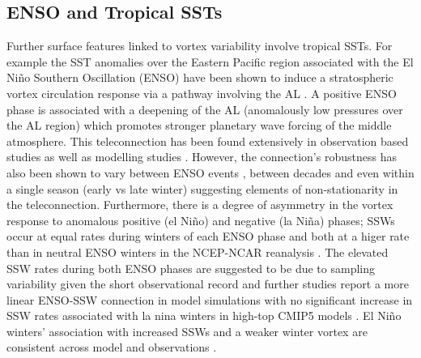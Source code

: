 \subsection{ENSO and Tropical SSTs}
\label{sec:external_influence_SSTs}
Further surface features linked to vortex variability involve tropical SSTs. For example the SST anomalies over the Eastern Pacific region associated with the El Ni\~{n}o Southern Oscillation (ENSO) have been shown to induce a stratospheric vortex circulation response via a pathway involving the AL \citep{domeisenTeleconnection2019}. A positive ENSO phase is associated with a deepening of the AL (anomalously low pressures over the AL region) which promotes stronger planetary wave forcing of the middle atmosphere. This teleconnection has been found extensively in observation based studies \citep{garfinkelDifferent2008, inesonRole2009, smithLinear2012} as well as modelling studies \citep{bellStratospheric2009, domeisenSeasonal2015, manziniInfluence2006, richterEffects2015}. However, the connection's robustness has also been shown to vary between ENSO events \citep{deserNorthern2017, izaStratospheric2016}, between decades \citep{ayarzaguena2018} and even within a single season (early vs late winter) \citep{ayarzaguenaIntraseasonal2018a} suggesting elements of non-stationarity in the teleconnection. Furthermore, there is a degree of asymmetry in the vortex response to anomalous positive (el Ni\~{n}o) and negative (la Ni\~{n}a) phases; SSWs occur at equal rates during winters of each ENSO phase and both at a higer rate than in neutral ENSO winters in the NCEP-NCAR reanalysis \citep{butlerNino2011, Garfinkel2012whymight}. The elevated SSW rates during both ENSO phases are suggested to be due to sampling variability given the short observational record and further studies report a more linear ENSO-SSW connection in model simulations \citep{polvaniDistinguishing2017} with no significant increase in SSW rates associated with la nina winters in high-top CMIP5 models \citep{songRevisiting2018}. El Ni\~{n}o winters' association with increased SSWs and a weaker winter vortex are consistent across model and observations \citep{manziniInfluence2006, richterEffects2015}. 

